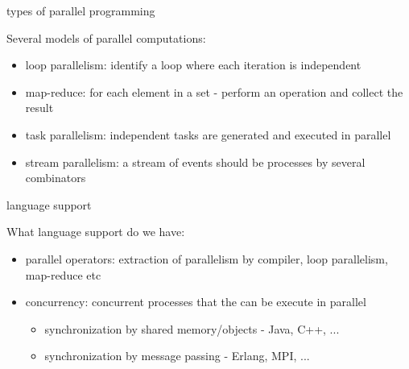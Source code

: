 \begin{frame}{types of parallel programming}

Several models of parallel computations:

\pause\vspace{20pt}

\begin{itemize}
 \pause\item loop parallelism: identify a loop where each iteration is independent
 \pause\item map-reduce: for each element in a set - perform an operation and collect the result
 \pause\item task parallelism: independent tasks are generated and executed in parallel
 \pause\item stream parallelism: a stream of events should be processes by several combinators
\end{itemize}

\pause\vspace{10pt}{\em A concurrent program could be executed in parallel but the focus is then concurrency not parallelism.}
\end{frame}

\begin{frame}{language support}

What language support do we have:

\begin{itemize}
 \pause\item parallel operators: extraction of parallelism by compiler, loop parallelism, map-reduce etc
 \pause\item concurrency:  concurrent processes that the can be execute in parallel
   \begin{itemize}
     \pause\item synchronization by shared memory/objects - Java, C++, ...
     \pause\item synchronization by message passing - Erlang, MPI, ...
   \end{itemize}
\end{itemize}

\end{frame}


